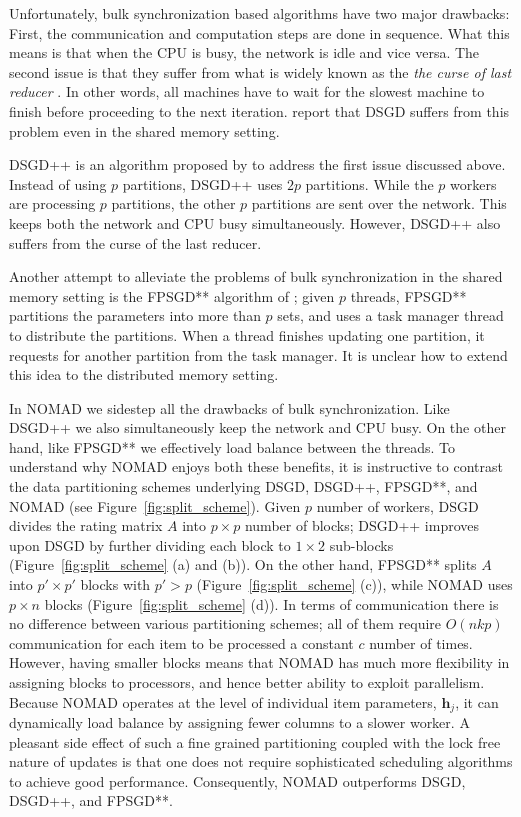 \documentclass{vldb}
\newcommand{\hb}{\mathbf{h}}
\begin{document}
Unfortunately, bulk synchronization based algorithms have two major
drawbacks: First, the communication and computation steps are done in
sequence. What this means is that when the CPU is busy, the network is
idle and vice versa. The second issue is that they suffer from what is
widely known as the \emph{the curse of last reducer}
\citep{SurVas11,AgaChaDudLan11}. In other words, all machines have to
wait for the slowest machine to finish before proceeding to the next
iteration. \citet{ZhuChiJuaLin13} report that DSGD suffers from this
problem even in the shared memory setting.

DSGD++ is an algorithm proposed by \citet{TefMakGem12} to address the
first issue discussed above. Instead of using $p$ partitions, DSGD++
uses $2p$ partitions. While the $p$ workers are processing $p$
partitions, the other $p$ partitions are sent over the network. This
keeps both the network and CPU busy simultaneously. However, DSGD++
also suffers from the curse of the last reducer. 

Another attempt to alleviate the problems of bulk synchronization in the
shared memory setting is the FPSGD** algorithm of
\citet{ZhuChiJuaLin13}; given $p$ threads, FPSGD** partitions the
parameters into more than $p$ sets, and uses a task manager thread to
distribute the partitions. When a thread finishes updating one
partition, it requests for another partition from the task manager. It
is unclear how to extend this idea to the distributed memory setting.

In NOMAD we sidestep all the drawbacks of bulk synchronization. Like
DSGD++ we also simultaneously keep the network and CPU busy. On the
other hand, like FPSGD** we effectively load balance between the
threads. To understand why NOMAD enjoys both these benefits, it is
instructive to contrast the data partitioning schemes underlying DSGD,
DSGD++, FPSGD**, and NOMAD (see Figure~\ref{fig:split_scheme}).  Given
$p$ number of workers, DSGD divides the rating matrix $A$ into $p
\times p$ number of blocks; DSGD++ improves upon DSGD by further
dividing each block to $1 \times 2$ sub-blocks
(Figure~\ref{fig:split_scheme} (a) and (b)).  On the other hand,
FPSGD** splits $A$ into $p' \times p'$ blocks with $p' > p$
(Figure~\ref{fig:split_scheme} (c)), while NOMAD uses $p \times n$
blocks (Figure~\ref{fig:split_scheme} (d)). In terms of communication
there is no difference between various partitioning schemes; all of
them require $O(nkp)$ communication for each item to be processed a
constant $c$ number of times. However, having smaller blocks means
that NOMAD has much more flexibility in assigning blocks to
processors, and hence better ability to exploit parallelism. Because
NOMAD operates at the level of individual item parameters, $\hb_{j}$,
it can dynamically load balance by assigning fewer columns to a slower
worker. A pleasant side effect of such a fine grained partitioning
coupled with the lock free nature of updates is that one does not
require sophisticated scheduling algorithms to achieve good
performance. Consequently, NOMAD outperforms DSGD, DSGD++, and
FPSGD**.
\end{document}
